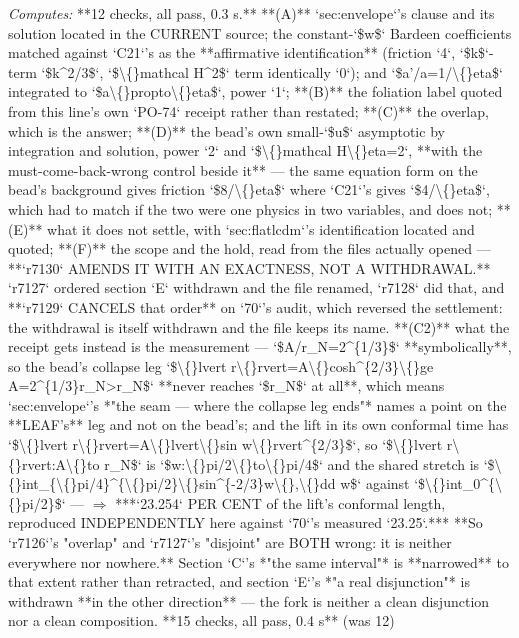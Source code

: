 \begin{description}
\emph{Computes:} **12 checks, all pass, 0.3 s.** **(A)** `sec:envelope`'s clause and its solution located in the CURRENT source; the constant-`\$w\$` Bardeen coefficients matched against `C21`'s as the **affirmative identification** (friction `4`, `\$k\$`-term `\$k\textasciicircum{}2/3\$`, `\$\textbackslash\{\}mathcal H\textasciicircum{}2\$` term identically `0`); and `\$a'/a=1/\textbackslash\{\}eta\$` integrated to `\$a\textbackslash\{\}propto\textbackslash\{\}eta\$`, power `1`; **(B)** the foliation label quoted from this line's own `PO-74` receipt rather than restated; **(C)** the overlap, which is the answer; **(D)** the bead's own small-`\$u\$` asymptotic by integration and solution, power `2` and `\$\textbackslash\{\}mathcal H\textbackslash\{\}eta=2`, **with the must-come-back-wrong control beside it** --- the same equation form on the bead's background gives friction `\$8/\textbackslash\{\}eta\$` where `C21`'s gives `\$4/\textbackslash\{\}eta\$`, which had to match if the two were one physics in two variables, and does not; **(E)** what it does not settle, with `sec:flatlcdm`'s identification located and quoted; **(F)** the scope and the hold, read from the files actually opened ---  **`r7130` AMENDS IT WITH AN EXACTNESS, NOT A WITHDRAWAL.** `r7127` ordered section `E` withdrawn and the file renamed, `r7128` did that, and **`r7129` CANCELS that order** on `70`'s audit, which reversed the settlement: the withdrawal is itself withdrawn and the file keeps its name. **(C2)** what the receipt gets instead is the measurement --- `\$A/r\_N=2\textasciicircum{}\{1/3\}\$` **symbolically**, so the bead's collapse leg `\$\textbackslash\{\}lvert r\textbackslash\{\}rvert=A\textbackslash\{\}cosh\textasciicircum{}\{2/3\}\textbackslash\{\}ge A=2\textasciicircum{}\{1/3\}r\_N>r\_N\$` **never reaches `\$r\_N\$` at all**, which means `sec:envelope`'s *"the seam --- where the collapse leg ends"* names a point on the **LEAF's** leg and not on the bead's; and the lift in its own conformal time has `\$\textbackslash\{\}lvert r\textbackslash\{\}rvert=A\textbackslash\{\}lvert\textbackslash\{\}sin w\textbackslash\{\}rvert\textasciicircum{}\{2/3\}\$`, so `\$\textbackslash\{\}lvert r\textbackslash\{\}rvert:A\textbackslash\{\}to r\_N\$` is `\$w:\textbackslash\{\}pi/2\textbackslash\{\}to\textbackslash\{\}pi/4\$` and the shared stretch is `\$\textbackslash\{\}int\_\{\textbackslash\{\}pi/4\}\textasciicircum{}\{\textbackslash\{\}pi/2\}\textbackslash\{\}sin\textasciicircum{}\{-2/3\}w\textbackslash\{\},\textbackslash\{\}dd w\$` against `\$\textbackslash\{\}int\_0\textasciicircum{}\{\textbackslash\{\}pi/2\}\$` --- \ensuremath{\Rightarrow} ***`23.254` PER CENT of the lift's conformal length, reproduced INDEPENDENTLY here against `70`'s measured `23.25`.***  **So `r7126`'s "overlap" and `r7127`'s "disjoint" are BOTH wrong: it is neither everywhere nor nowhere.** Section `C`'s *"the same interval"* is **narrowed** to that extent rather than retracted, and section `E`'s *"a real disjunction"* is withdrawn **in the other direction** --- the fork is neither a clean disjunction nor a clean composition. **15 checks, all pass, 0.4 s** (was 12)

\end{description}
